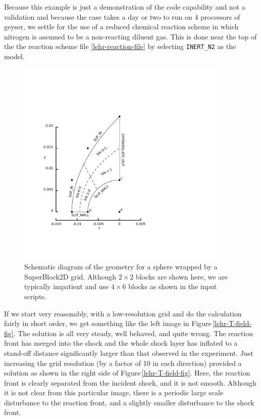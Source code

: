 \medskip
Because this example is just a demonstration of the code capability and not a validation
and because the case takes a day or two to run on 4 processors of geyser,
we settle for the use of a reduced chemical reaction scheme in which nitrogen is assumed to be
a non-reacting diluent gas.
This is done near the top of the the reaction scheme file \ref{lehr-reaction-file} 
by selecting \texttt{INERT\_N2} as the model.

\begin{figure}[htbp]
\begin{center}
\includegraphics[width=10cm,viewport=43 73 288 344,clip=true]{../2D/lehr-479/lehr-layout.pdf}
\end{center}
\caption{Schematic diagram of the geometry for a sphere wrapped by a SuperBlock2D grid.
   Although $2 \times 2$ blocks are shown here, we are typically impatient and 
   use $4 \times 6$ blocks as shown in the input scripts.}
\label{lehr-geometry-fig}
\end{figure}

\medskip
If we start very reasonably, with a low-resolution grid and do the calculation fairly in short order,
we get something like the left image in Figure\,\ref{lehr-T-field-fig}.
The solution is all very steady, well behaved, and quite wrong.
The reaction front has merged into the shock and the whole shock layer has inflated to a stand-off distance
significantly larger than that observed in the experiment.
Just increasing the grid resolution (by a factor of 10 in each direction) provided a solution as shown in the right
side of Figure\,\ref{lehr-T-field-fig}.
Here, the reaction front is clearly separated from the incident shock, and it is not smooth.
Although it is not clear from this particular image, there is a periodic large scale disturbance 
to the reaction front, and a slightly smaller disturbance to the shock front.

